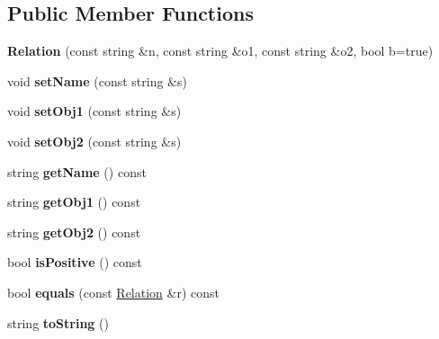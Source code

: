 \subsection*{Public Member Functions}
\begin{DoxyCompactItemize}
\item 
\hypertarget{classCartWheel_1_1Relation_a9189655dc26c9e7265420a64dc383eb2}{
{\bfseries Relation} (const string \&n, const string \&o1, const string \&o2, bool b=true)}
\label{classCartWheel_1_1Relation_a9189655dc26c9e7265420a64dc383eb2}

\item 
\hypertarget{classCartWheel_1_1Relation_a77cc7f84b35a69e5974a8e8435a7c73c}{
void {\bfseries setName} (const string \&s)}
\label{classCartWheel_1_1Relation_a77cc7f84b35a69e5974a8e8435a7c73c}

\item 
\hypertarget{classCartWheel_1_1Relation_aa8599f3d48ee952c8231416a81fcb416}{
void {\bfseries setObj1} (const string \&s)}
\label{classCartWheel_1_1Relation_aa8599f3d48ee952c8231416a81fcb416}

\item 
\hypertarget{classCartWheel_1_1Relation_a9a0dd9167da41ed68bd05232d358e57a}{
void {\bfseries setObj2} (const string \&s)}
\label{classCartWheel_1_1Relation_a9a0dd9167da41ed68bd05232d358e57a}

\item 
\hypertarget{classCartWheel_1_1Relation_a474636bfebfa8dc2949c3eecb405ed49}{
string {\bfseries getName} () const }
\label{classCartWheel_1_1Relation_a474636bfebfa8dc2949c3eecb405ed49}

\item 
\hypertarget{classCartWheel_1_1Relation_a0ac10fb3b362c1f8c4806495ee32b49c}{
string {\bfseries getObj1} () const }
\label{classCartWheel_1_1Relation_a0ac10fb3b362c1f8c4806495ee32b49c}

\item 
\hypertarget{classCartWheel_1_1Relation_ab14bee15f71287288a562545c5b70f70}{
string {\bfseries getObj2} () const }
\label{classCartWheel_1_1Relation_ab14bee15f71287288a562545c5b70f70}

\item 
\hypertarget{classCartWheel_1_1Relation_afe6de5d76847c25a2c539a213344e262}{
bool {\bfseries isPositive} () const }
\label{classCartWheel_1_1Relation_afe6de5d76847c25a2c539a213344e262}

\item 
\hypertarget{classCartWheel_1_1Relation_ace0f6b8db9e8f843b695f8fdd2a57535}{
bool {\bfseries equals} (const \hyperlink{classCartWheel_1_1Relation}{Relation} \&r) const }
\label{classCartWheel_1_1Relation_ace0f6b8db9e8f843b695f8fdd2a57535}

\item 
\hypertarget{classCartWheel_1_1Relation_aea526a24acf95e9d41525b832215174d}{
string {\bfseries toString} ()}
\label{classCartWheel_1_1Relation_aea526a24acf95e9d41525b832215174d}

\end{DoxyCompactItemize}
